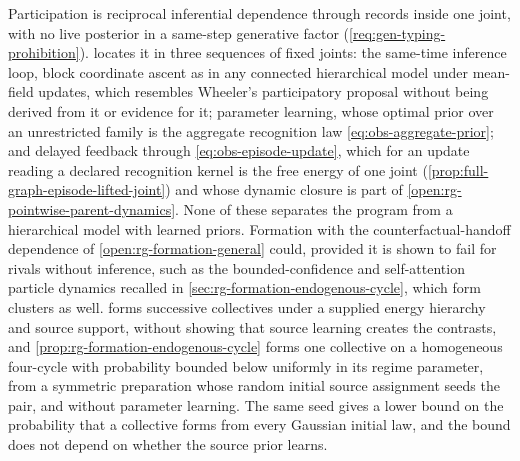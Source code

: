 Participation is reciprocal inferential dependence through records inside one
joint, with no live posterior in a same-step generative factor
(\cref{req:gen-typing-prohibition}).  locates
it in three sequences of fixed joints: the same-time inference loop, block
coordinate ascent as in any connected hierarchical model under mean-field
updates, which resembles Wheeler's participatory proposal \citep{Wheeler1990}
without being derived from it or evidence for it; parameter learning, whose
optimal prior over an unrestricted family is the aggregate recognition law
\eqref{eq:obs-aggregate-prior}; and delayed feedback through
\eqref{eq:obs-episode-update}, which for an update reading a declared
recognition kernel is the free energy of one joint
(\cref{prop:full-graph-episode-lifted-joint}) and whose dynamic closure is
part of \cref{open:rg-pointwise-parent-dynamics}. None of these separates the program
from a hierarchical model with learned priors. Formation with the
counterfactual-handoff dependence of \cref{open:rg-formation-general} could,
provided it is shown to fail for rivals without inference, such as the
bounded-confidence and self-attention particle dynamics recalled in
\cref{sec:rg-formation-endogenous-cycle}, which form clusters as well.
 forms successive collectives under a
supplied energy hierarchy and source support, without showing that source
learning creates the contrasts, and \cref{prop:rg-formation-endogenous-cycle}
forms one collective on a homogeneous four-cycle with probability bounded below
uniformly in its regime parameter, from a symmetric preparation whose random
initial source assignment seeds the pair, and without parameter learning. The
same seed gives a lower bound on the probability that a collective forms from
every Gaussian initial law, and the bound does not depend on whether the source
prior learns.

